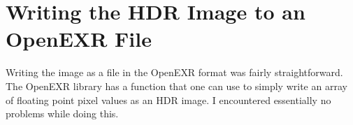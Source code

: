 \section{Writing the HDR Image to an OpenEXR File}\label{sec:exr}

Writing the image as a file in the OpenEXR format was fairly straightforward.
The OpenEXR library has a function that one can use to simply write an array of
floating point pixel values as an HDR image. I encountered essentially no
problems while doing this.
